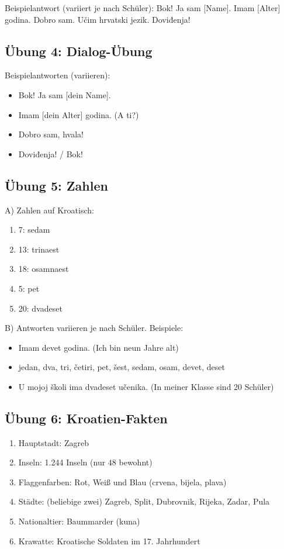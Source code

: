 Beispielantwort (variiert je nach Schüler):
Bok! Ja sam [Name]. Imam [Alter] godina. Dobro sam. Učim hrvatski jezik. Doviđenja!

\subsection*{Übung 4: Dialog-Übung}

Beispielantworten (variieren):
\begin{itemize}
    \item Bok! Ja sam [dein Name].
    \item Imam [dein Alter] godina. (A ti?)
    \item Dobro sam, hvala!
    \item Doviđenja! / Bok!
\end{itemize}

\subsection*{Übung 5: Zahlen}

A) Zahlen auf Kroatisch:
\begin{enumerate}
    \item 7: sedam
    \item 13: trinaest
    \item 18: osamnaest
    \item 5: pet
    \item 20: dvadeset
\end{enumerate}

B) Antworten variieren je nach Schüler. Beispiele:
\begin{itemize}
    \item Imam devet godina. (Ich bin neun Jahre alt)
    \item jedan, dva, tri, četiri, pet, šest, sedam, osam, devet, deset
    \item U mojoj školi ima dvadeset učenika. (In meiner Klasse sind 20 Schüler)
\end{itemize}

\subsection*{Übung 6: Kroatien-Fakten}

\begin{enumerate}
    \item Hauptstadt: Zagreb
    \item Inseln: 1.244 Inseln (nur 48 bewohnt)
    \item Flaggenfarben: Rot, Weiß und Blau (crvena, bijela, plava)
    \item Städte: (beliebige zwei) Zagreb, Split, Dubrovnik, Rijeka, Zadar, Pula
    \item Nationaltier: Baummarder (kuna)
    \item Krawatte: Kroatische Soldaten im 17. Jahrhundert
\end{enumerate}

